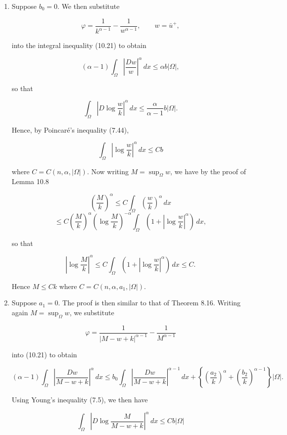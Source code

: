 \begin{enumerate}
\item[(i)] Suppose $b_{0}=0$. We then substitute

\[
\varphi=\frac{1}{k^{\alpha-1}}-\frac{1}{w^{\alpha-1}},\qquad w=\bar u^{+},
\]

into the integral inequality (10.21) to obtain

\[
(\alpha-1)\int_{\Omega}\left|\frac{Dw}{w}\right|^{\alpha}\,dx\le \alpha b|\Omega|,
\]

so that

\[
\int_{\Omega}\left|D\log\frac{w}{k}\right|^{\alpha}\,dx\le \frac{\alpha}{\alpha-1}b|\Omega|.
\]

Hence, by Poincar\'e's inequality (7.44),

\[
\int_{\Omega}\left|\log\frac{w}{k}\right|^{\alpha}\,dx\le Cb
\]

where $C=C(n,\alpha,|\Omega|)$. Now writing $M=\sup_{\Omega}w$, we have by the proof of Lemma
10.8

\[
\left(\frac{M}{k}\right)^{\alpha}\le C\int_{\Omega}\left(\frac{w}{k}\right)^{\alpha}\,dx
\]
\[
\le C\left(\frac{M}{k}\right)^{\alpha}\left(\log\frac{M}{k}\right)^{-\alpha}\int_{\Omega}\left(1+\left|\log\frac{w}{k}\right|^{\alpha}\right)\,dx,
\]

so that

\[
\left|\log\frac{M}{k}\right|^{\alpha}\le C\int_{\Omega}\left(1+\left|\log\frac{w}{k}\right|^{\alpha}\right)\,dx\le C.
\]

Hence $M\le Ck$ where $C=C(n,\alpha,a_{1},|\Omega|)$.

\item[(ii)] Suppose $a_{1}=0$. The proof is then similar to that of Theorem 8.16. Writing
again $M=\sup_{\Omega}w$, we substitute

\[
\varphi=\frac{1}{|M-w+k|^{\alpha-1}}-\frac{1}{M^{\alpha-1}}
\]




into (10.21) to obtain

\[
(\alpha-1)\int_{\Omega}\left|\frac{Dw}{M-w+k}\right|^{\alpha}\,dx
\le b_0\int_{\Omega}\left|\frac{Dw}{M-w+k}\right|^{\alpha-1}\,dx
+\left\{\left(\frac{a_2}{k}\right)^{\alpha}+\left(\frac{b_2}{k}\right)^{\alpha-1}\right\}|\Omega|.
\]

Using Young’s inequality (7.5), we then have

\[
\int_{\Omega}\left|D\log\frac{M}{M-w+k}\right|^{\alpha}\,dx\le Cb|\Omega|
\]


\end{enumerate}
